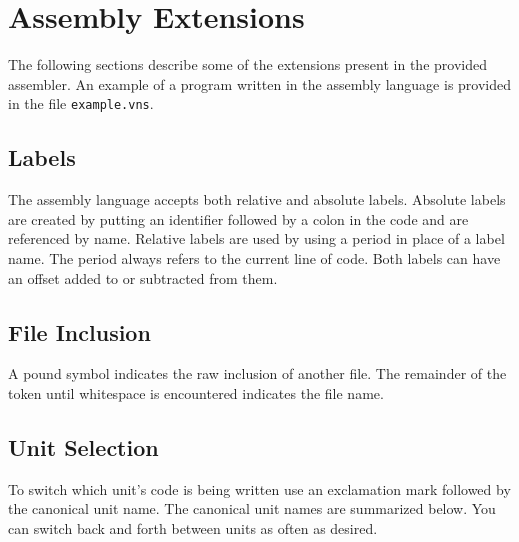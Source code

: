 \documentclass{article}
\begin{document}
\section{Assembly Extensions}

The following sections describe some of the extensions present in the provided
assembler. An example of a program written in the assembly language is provided
in the file \texttt{example.vns}.

\subsection{Labels}

The assembly language accepts both relative and absolute labels. Absolute labels
are created by putting an identifier followed by a colon in the code and are
referenced by name. Relative labels are used by using a period in place of a
label name. The period always refers to the current line of code. Both labels
can have an offset added to or subtracted from them.

\subsection{File Inclusion}

A pound symbol indicates the raw inclusion of another file. The remainder of the
token until whitespace is encountered indicates the file name.

\subsection{Unit Selection}

To switch which unit's code is being written use an exclamation mark followed by
the canonical unit name. The canonical unit names are summarized below. You can
switch back and forth between units as often as desired.
\end{document}
